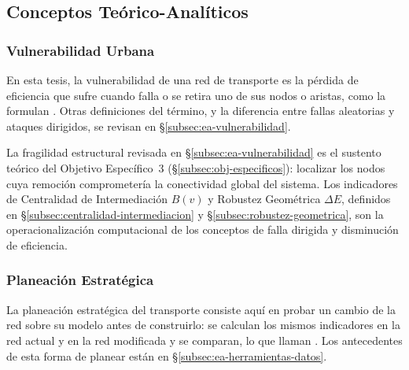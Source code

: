 
\subsection{Conceptos Teórico-Analíticos}
\label{subsec:conceptos-operativos}

\subsubsection*{Vulnerabilidad Urbana}
\label{subsec:vulnerabilidad-urbana}

En esta tesis, la vulnerabilidad de una red de transporte es la pérdida de
eficiencia que sufre cuando falla o se retira uno de sus nodos o aristas, como
la formulan \citet{ouyang2009vulnerability}. Otras definiciones del término, y
la diferencia entre fallas aleatorias y ataques dirigidos, se revisan en
§\ref{subsec:ea-vulnerabilidad}.

La fragilidad estructural revisada en §\ref{subsec:ea-vulnerabilidad} es el
sustento teórico del Objetivo Específico~3 (§\ref{subsec:obj-especificos}):
localizar los nodos cuya remoción comprometería la conectividad global del
sistema. Los indicadores de Centralidad de Intermediación $B(v)$ y Robustez
Geométrica $\Delta E$, definidos en §\ref{subsec:centralidad-intermediacion} y
§\ref{subsec:robustez-geometrica}, son la operacionalización computacional de los
conceptos de falla dirigida y disminución de eficiencia.

\subsubsection*{Planeación Estratégica}
\label{subsec:planeacion-estrategica}

La planeación estratégica del transporte consiste aquí en probar un cambio de
la red sobre su modelo antes de construirlo: se calculan los mismos indicadores
en la red actual y en la red modificada y se comparan, lo que
\citet{fortin2016innovative} llaman . Los
antecedentes de esta forma de planear están en §\ref{subsec:ea-herramientas-datos}.

